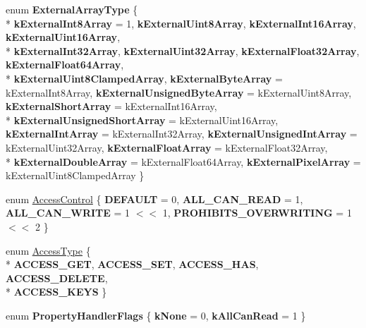 \begin{DoxyCompactItemize}
\item 
\hypertarget{namespacev8_aabbbc5430374565be119ff192a40544e}{}enum {\bfseries External\+Array\+Type} \{ \\*
{\bfseries k\+External\+Int8\+Array} = 1, 
{\bfseries k\+External\+Uint8\+Array}, 
{\bfseries k\+External\+Int16\+Array}, 
{\bfseries k\+External\+Uint16\+Array}, 
\\*
{\bfseries k\+External\+Int32\+Array}, 
{\bfseries k\+External\+Uint32\+Array}, 
{\bfseries k\+External\+Float32\+Array}, 
{\bfseries k\+External\+Float64\+Array}, 
\\*
{\bfseries k\+External\+Uint8\+Clamped\+Array}, 
{\bfseries k\+External\+Byte\+Array} = k\+External\+Int8\+Array, 
{\bfseries k\+External\+Unsigned\+Byte\+Array} = k\+External\+Uint8\+Array, 
{\bfseries k\+External\+Short\+Array} = k\+External\+Int16\+Array, 
\\*
{\bfseries k\+External\+Unsigned\+Short\+Array} = k\+External\+Uint16\+Array, 
{\bfseries k\+External\+Int\+Array} = k\+External\+Int32\+Array, 
{\bfseries k\+External\+Unsigned\+Int\+Array} = k\+External\+Uint32\+Array, 
{\bfseries k\+External\+Float\+Array} = k\+External\+Float32\+Array, 
\\*
{\bfseries k\+External\+Double\+Array} = k\+External\+Float64\+Array, 
{\bfseries k\+External\+Pixel\+Array} = k\+External\+Uint8\+Clamped\+Array
 \}\label{namespacev8_aabbbc5430374565be119ff192a40544e}

\item 
enum \hyperlink{namespacev8_a31d8355cb043d7d2dda3f4a52760b64e}{Access\+Control} \{ {\bfseries D\+E\+F\+A\+U\+L\+T} = 0, 
{\bfseries A\+L\+L\+\_\+\+C\+A\+N\+\_\+\+R\+E\+A\+D} = 1, 
{\bfseries A\+L\+L\+\_\+\+C\+A\+N\+\_\+\+W\+R\+I\+T\+E} = 1 $<$$<$ 1, 
{\bfseries P\+R\+O\+H\+I\+B\+I\+T\+S\+\_\+\+O\+V\+E\+R\+W\+R\+I\+T\+I\+N\+G} = 1 $<$$<$ 2
 \}
\item 
enum \hyperlink{namespacev8_add8bef6469c5b94706584124e610046c}{Access\+Type} \{ \\*
{\bfseries A\+C\+C\+E\+S\+S\+\_\+\+G\+E\+T}, 
{\bfseries A\+C\+C\+E\+S\+S\+\_\+\+S\+E\+T}, 
{\bfseries A\+C\+C\+E\+S\+S\+\_\+\+H\+A\+S}, 
{\bfseries A\+C\+C\+E\+S\+S\+\_\+\+D\+E\+L\+E\+T\+E}, 
\\*
{\bfseries A\+C\+C\+E\+S\+S\+\_\+\+K\+E\+Y\+S}
 \}
\item 
\hypertarget{namespacev8_af4789f0aeb8680e353901a35810cac1a}{}enum {\bfseries Property\+Handler\+Flags} \{ {\bfseries k\+None} = 0, 
{\bfseries k\+All\+Can\+Read} = 1
 \}\label{namespacev8_af4789f0aeb8680e353901a35810cac1a}


\end{DoxyCompactItemize}

